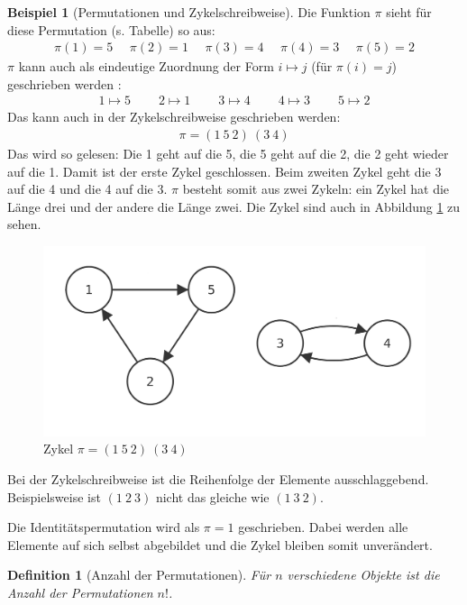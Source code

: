 \documentclass[12pt,a4paper, usenames, dvipsnames]{article}
\theoremstyle{mystyle}
\newtheorem{definition}{Definition}
\theoremstyle{definition}
\newtheorem{bsp}{Beispiel}[definition]
\begin{document}
\begin{bsp}[Permutationen und Zykelschreibweise]
Die Funktion $\pi$ sieht für diese Permutation (s. Tabelle) so aus:
\begin{align*}
\pi(1) = 5 \ \ \ \ \ \  \pi(2) = 1 \ \ \ \ \ \ \pi(3) = 4 \ \ \ \ \ \ \pi(4) = 3 \ \ \ \ \ \ \pi(5) = 2 
\end{align*}
$\pi$ kann auch als eindeutige Zuordnung der Form $i \mapsto j$ (für $\pi(i)=j$) geschrieben werden \cite{JC}:
\begin{align*}
1 \mapsto 5 \ \ \ \ \ \ \ \ \ \  2\mapsto 1 \ \ \ \ \ \ \ \ \ \ 3\mapsto 4 \ \ \ \ \ \ \ \ \ \ 4\mapsto 3 \ \ \ \ \ \ \ \ \ \ 5\mapsto 2 
\end{align*}
Das kann auch in der Zykelschreibweise geschrieben werden:
\begin{align*}
\pi = (1 \ 5 \ 2)\ (3 \ 4)
\end{align*}
Das wird so gelesen: Die 1 geht auf die 5, die 5 geht auf die 2, die 2 geht wieder auf die 1. Damit ist der erste Zykel geschlossen. Beim zweiten Zykel geht die 3 auf die 4 und die 4 auf die 3. $\pi$ besteht somit aus zwei Zykeln: ein Zykel hat die Länge drei und der andere die Länge zwei. Die Zykel sind auch in Abbildung \ref{Abbildung_ZykelVonf} zu sehen.
\begin{figure}[H]
\centering
\includegraphics[scale=0.13]{Zykel_152.png}
\caption{Zykel $\pi = (1 \ 5 \ 2)\ (3 \ 4)$}
\label{Abbildung_ZykelVonf}
\end{figure}
Bei der Zykelschreibweise ist die Reihenfolge der Elemente ausschlaggebend. Beispielsweise ist $(1 \ 2 \ 3)$ nicht das gleiche wie $(1 \ 3 \ 2)$. 

Die Identitätspermutation wird als $\pi = 1$ geschrieben. Dabei werden alle Elemente auf sich selbst abgebildet und die Zykel bleiben somit unverändert.
\end{bsp}

\begin{definition}[Anzahl der Permutationen]
Für $n$ verschiedene Objekte ist die Anzahl der Permutationen $n!$.
\end{definition}
\end{document}
